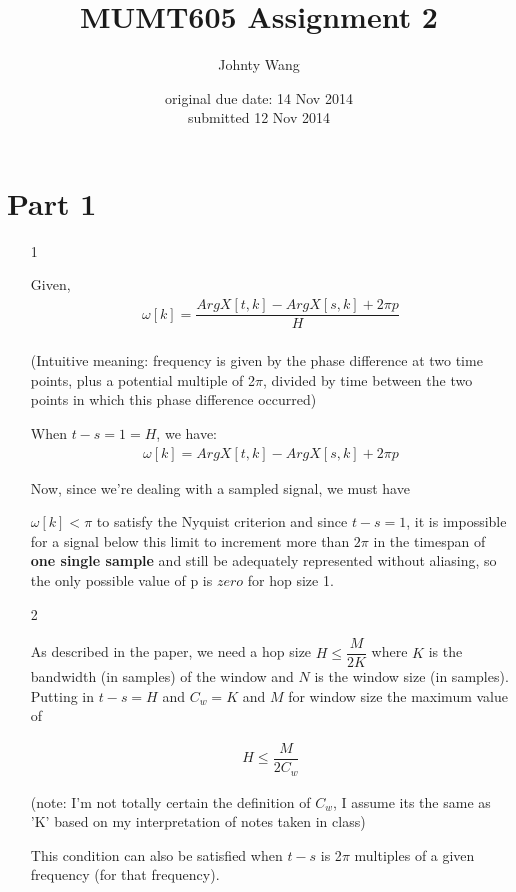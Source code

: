\documentclass[12pt]{article}
\title{MUMT605 Assignment 2}
\author{Johnty Wang}
\date{original due date: 14 Nov 2014\\submitted 12 Nov 2014}
\begin{document}
\maketitle

\section*{Part 1}
\begin{enumerate}


\item[1]{

Given,
\begin{align*}
\omega[k] = \dfrac{Arg X [t,k] - Arg X [s, k] + 2\pi p}{H}\\
\end{align*}

(Intuitive meaning: frequency is given by the phase difference at two time points, plus a potential multiple of 2$\pi$, divided by time between the two points in which this phase difference occurred)

When $t - s = 1 = H$, we have:
\begin{align*}
\omega[k] = Arg X [t,k] - Arg X [s, k] + 2\pi p
\end{align*}

Now, since we're dealing with a sampled signal, we must have 

$\omega[k] < \pi$ to satisfy the Nyquist criterion and since $t - s = 1$, it is impossible for a signal below this limit to increment more than $2\pi$ in the timespan of \textbf{one single sample} and still be adequately represented without aliasing, so the only possible value of p is $zero$ for hop size 1.
}

\item[2]{

As described in the paper, we need a hop size $H \leq \dfrac{M}{2K}$ where $K$ is the bandwidth (in samples) of the window and $N$ is the window size (in samples). Putting in $t - s = H$ and $C_w = K$ and $M$ for window size the maximum value of

\begin{align*}
H \leq \dfrac{M}{2C_w}
\end{align*}

(note: I'm not totally certain the definition of $C_w$, I assume its the same as 'K' based on my interpretation of notes taken in class)

This condition can also be satisfied when $t - s$ is 2$\pi$ multiples of a given frequency (for that frequency).
}


\end{enumerate}
\end{document}

